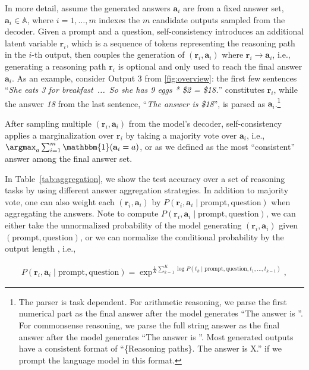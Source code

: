 In more detail, assume the generated answers $\mathbf{a}_i$ are from a fixed answer set, $\mathbf{a}_i\in \mathbb{A}$, where $i=1, \ldots, m$ indexes the $m$ candidate outputs sampled from the decoder. Given a prompt and a question, self-consistency introduces an additional latent variable $\mathbf{r}_i$, which is a sequence of tokens representing the reasoning path in the $i$-th output, then couples the generation of $(\mathbf{r}_i, \mathbf{a}_i)$ where $\mathbf{r}_i\rightarrow \mathbf{a}_i$, i.e., generating a reasoning path $\mathbf{r}_i$ is optional and only used to reach the final answer $\mathbf{a}_i$.
As an example, consider Output 3 from \ref{fig:overview}: 
the first few sentences ``\textit{She eats 3 for breakfast\ ...\ So she has 9 eggs * \$2 = \$18.}'' constitutes $\mathbf{r}_i$, while the answer \textit{18} from the last sentence, ``\textit{The answer is \$18}'', is parsed as $\mathbf{a}_i$.\footnote{The parser is task dependent. For arithmetic reasoning, we parse the first numerical part as the final answer after the model generates ``The answer is ''. For commonsense reasoning, we parse the full string answer as the final answer after the model generates ``The answer is ''. Most generated outputs have a consistent format of ``\{Reasoning paths\}. The answer is X.'' if we prompt the language model in this format.}

After sampling multiple $(\mathbf{r}_i, \mathbf{a}_i)$ from the model's decoder, self-consistency applies a marginalization over $\mathbf{r}_i$ by taking a majority vote over $\mathbf{a}_i$, i.e., $\argmax_a\sum\nolimits_{i=1}^m \mathbbm{1} (\mathbf{a}_i = a)$, or as we defined as the most ``consistent'' answer among the final answer set.

In Table~\ref{tab:aggregation}, we show the test accuracy over a set of reasoning tasks by using different answer aggregation strategies. In addition to majority vote, one can also weight each $(\mathbf{r}_i, \mathbf{a}_i)$ by $P(\mathbf{r}_i, \mathbf{a}_i \mid \text{prompt}, \text{question})$ when aggregating the answers. Note to compute $P(\mathbf{r}_i, \mathbf{a}_i \mid \text{prompt}, \text{question})$, we can either take the unnormalized probability of the model generating $(\mathbf{r}_i, \mathbf{a}_i)$ given $(\text{prompt}, \text{question})$, or we can normalize the conditional probability by the output length \citep{brown2020language}, i.e.,

\begin{align}
\label{eq2}
P(\mathbf{r}_i, \mathbf{a}_i \mid \text{prompt}, \text{question}) = \exp^{\frac{1}{K}\sum_{k=1}^K {\log P(t_k \mid \text{prompt}, \text{question}, t_1, \ldots, t_{k-1})}},
\end{align}


